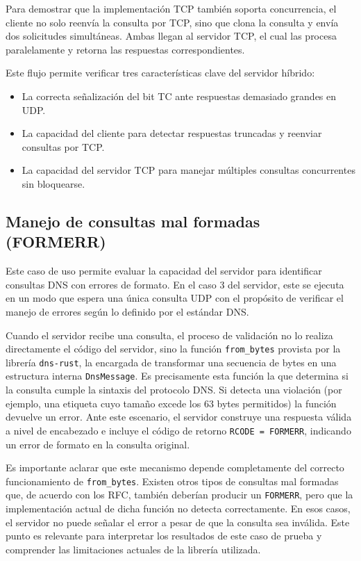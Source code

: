 Para demostrar que la implementación TCP también soporta concurrencia, el cliente no solo reenvía la consulta por TCP, sino que clona la consulta y envía dos solicitudes simultáneas. 
Ambas llegan al servidor TCP, el cual las procesa paralelamente y retorna las respuestas correspondientes.

Este flujo permite verificar tres características clave del servidor híbrido:

\begin{itemize}
    \item La correcta señalización del bit TC ante respuestas demasiado grandes en UDP.
    \item La capacidad del cliente para detectar respuestas truncadas y reenviar consultas por TCP.
    \item La capacidad del servidor TCP para manejar múltiples consultas concurrentes sin bloquearse.
\end{itemize}


\subsection{Manejo de consultas mal formadas (FORMERR)}

Este caso de uso permite evaluar la capacidad del servidor para identificar consultas DNS con errores de formato. En el caso 3 del servidor, este se ejecuta en un modo que espera una única consulta UDP con 
el propósito de verificar el manejo de errores según lo definido por el estándar DNS.

Cuando el servidor recibe una consulta, el proceso de validación no lo realiza directamente el código del servidor, sino la función \texttt{from\_bytes} provista por la librería \texttt{dns-rust}, 
la encargada de transformar una secuencia de bytes en una estructura interna \texttt{DnsMessage}.
Es precisamente esta función la que determina si la consulta cumple la sintaxis del protocolo DNS. Si detecta una violación (por ejemplo, una etiqueta cuyo tamaño excede los 63 bytes permitidos)
la función devuelve un error. Ante este escenario, el servidor construye una respuesta válida a nivel de encabezado e incluye el código de retorno \texttt{RCODE = FORMERR}, indicando un error de 
formato en la consulta original.

Es importante aclarar que este mecanismo depende completamente del correcto funcionamiento de \texttt{from\_bytes}. Existen otros tipos de consultas mal formadas que, de acuerdo con los RFC, 
también deberían producir un \texttt{FORMERR}, pero que la implementación actual de dicha función no detecta correctamente. En esos casos, el servidor no puede señalar el error a pesar de que la 
consulta sea inválida. Este punto es relevante para interpretar los resultados de este caso de prueba y comprender las limitaciones actuales de la librería utilizada.



